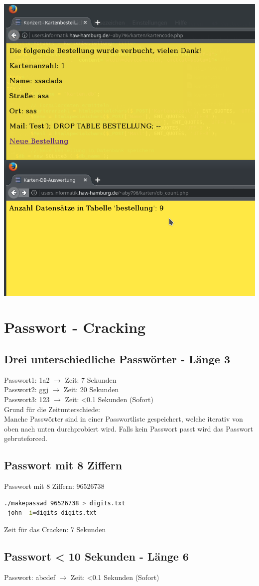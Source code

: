 \documentclass[a4paper,10pt]{article}
\begin{document}
\includegraphics[scale=0.7]{sqli_fixed.png}
\section{Passwort - Cracking}
\subsection{Drei unterschiedliche Passwörter - Länge 3}
Passwort1: 1a2 $\rightarrow$ Zeit: 7 Sekunden \\
Passwort2: ggj $\rightarrow$ Zeit: 20 Sekunden \\
Passwort3: 123 $\rightarrow$ Zeit: <0.1 Sekunden (Sofort) \\
Grund für die Zeitunterschiede: \\
Manche Passwörter sind in einer Passwortliste gespeichert, welche iterativ von oben nach unten durchprobiert wird. Falls kein Passwort passt wird 
das Passwort gebruteforced. \\ 
\subsection{Passwort mit 8 Ziffern}
Passwort mit 8 Ziffern: 96526738 \\
\begin{lstlisting}[language=bash]
 ./makepasswd 96526738 > digits.txt
 john -i=digits digits.txt
 \end{lstlisting}
Zeit für das Cracken: 7 Sekunden 
\subsection{Passwort < 10 Sekunden - Länge 6}
Passwort: abcdef $\rightarrow$ Zeit: <0.1 Sekunden (Sofort)
\end{document}
